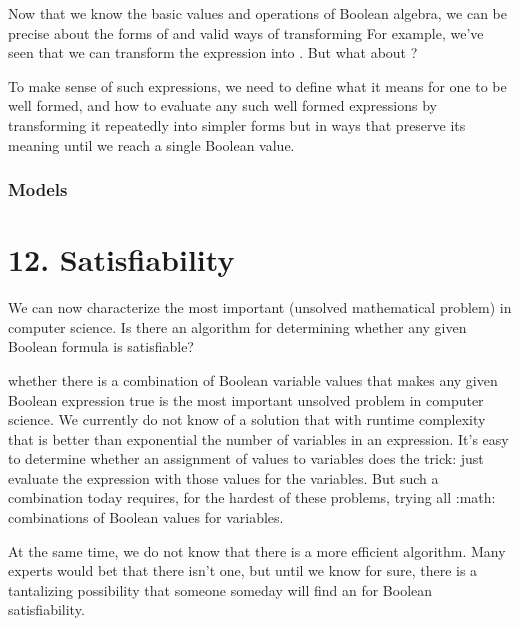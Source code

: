 \documentclass[letterpaper,10pt,english]{sphinxmanual}
\begin{document}
Now that we know the basic values and operations of Boolean algebra,
we can be precise about the forms of and valid ways of transforming
 For example, we’ve seen that we can transform
the expression  into . But what about ?

To make sense of such expressions, we need to define what it means for
one to be well formed, and how to evaluate any such well formed
expressions by transforming it repeatedly into simpler forms but in
ways that preserve its meaning until we reach a single Boolean value.


\subsection{Models}
\label{\detokenize{11-propositional-logic:models}}

\chapter{12. Satisfiability}
\label{\detokenize{12-satisfiability:satisfiability}}\label{\detokenize{12-satisfiability::doc}}
We can now characterize the most important  (unsolved
mathematical problem) in computer science.  Is there an 
algorithm for determining whether any given Boolean formula is
satisfiable?

whether there is a combination of Boolean
variable values that makes any given Boolean expression true is the
most important unsolved problem in computer science. We currently do
not know of a solution that with runtime complexity that is better
than exponential the number of variables in an expression.  It’s easy
to determine whether an assignment of values to variables does the
trick: just evaluate the expression with those values for the
variables. But  such a combination today requires, for the
hardest of these problems, trying all :math: combinations of
Boolean values for  variables.

At the same time, we do not know that there is  a more efficient
algorithm. Many experts would bet that there isn’t one, but until we
know for sure, there is a tantalizing possibility that someone someday
will find an  for Boolean satisfiability.
\end{document}
